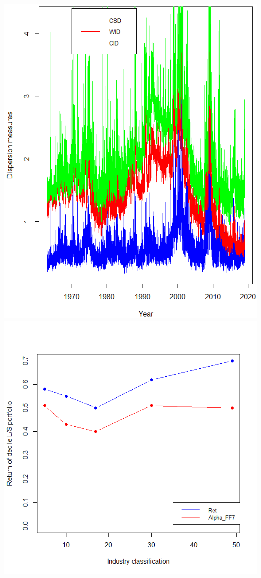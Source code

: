 \documentclass[16pt]{article}
\begin{document}
\includegraphics[width=1\textwidth]{fig1.png}
\includegraphics[width=1\textwidth]{alphas_inds.png}
\end{document}
